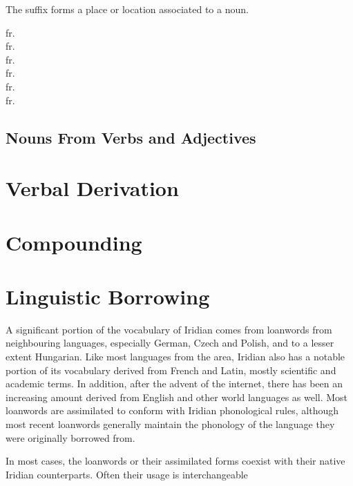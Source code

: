 The suffix  forms a place or location associated to a noun.

\ex
{} fr. \\
 fr. \\
 fr. \\
 fr. \\
 fr. \\
 fr. \\
\xe

\subsection{Nouns From Verbs and Adjectives}
\section{Verbal Derivation}

\section{Compounding}\label{sec:compounding}

\section{Linguistic Borrowing}
A significant portion of the vocabulary of Iridian comes from loanwords from neighbouring languages, especially German, Czech and Polish, and to a lesser extent Hungarian. Like most languages from the area, Iridian also has a notable portion of its vocabulary derived from French and Latin, mostly scientific and academic terms. In addition, after the advent of the internet, there has been an increasing amount derived from English and other world languages as well. Most loanwords are assimilated to conform with Iridian phonological rules, although most recent loanwords generally maintain the phonology of the language they were originally borrowed from.

In most cases, the loanwords or their assimilated forms coexist with their native Iridian counterparts. Often their usage is interchangeable


